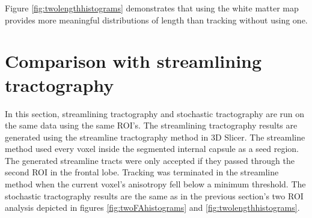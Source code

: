 Figure \ref{fig:twolengthhistograms} demonstrates that using the white matter map provides more meaningful distributions of length than tracking without using one.

\section{Comparison with streamlining tractography}
In this section, streamlining tractography and stochastic tractography are run on the same data using the same ROI's.  The streamlining tractography results are generated using the streamline tractography method in 3D Slicer.  The streamline method used every voxel inside the segmented internal capsule as a seed region.  The generated streamline tracts were only accepted if they passed through the second ROI in the frontal lobe.  Tracking was terminated in the streamline method when the current voxel's anisotropy fell below a minimum threshold.  The stochastic tractography results are the same as in the previous section's two ROI analysis depicted in figures \ref{fig:twoFAhistograms} and \ref{fig:twolengthhistograms}.

